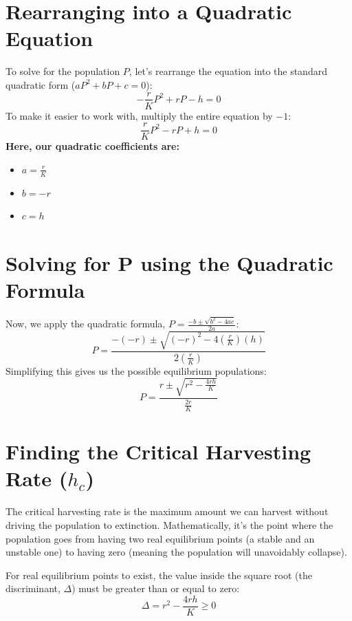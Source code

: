 \documentclass[12pt]{article}
\begin{document}
\section{Rearranging into a Quadratic Equation}
To solve for the population $P$, let's rearrange the equation into the standard quadratic form ($aP^2 + bP + c = 0$):
\begin{equation*}
-\frac{r}{K}P^2 + rP - h = 0
\end{equation*}
To make it easier to work with, multiply the entire equation by $-1$:
\begin{equation*}
\frac{r}{K}P^2 - rP + h = 0
\end{equation*}
\textbf{Here, our quadratic coefficients are:}
\begin{itemize}
    \item $a = \frac{r}{K}$
    \item $b = -r$
    \item $c = h$
\end{itemize}

\section{Solving for P using the Quadratic Formula}
Now, we apply the quadratic formula, $P = \frac{-b \pm \sqrt{b^2 - 4ac}}{2a}$:
\begin{equation*}
P = \frac{-(-r) \pm \sqrt{(-r)^2 - 4 \left(\frac{r}{K}\right) (h)}}{2 \left(\frac{r}{K}\right)}
\end{equation*}
Simplifying this gives us the possible equilibrium populations:
\begin{equation*}
P = \frac{r \pm \sqrt{r^2 - \frac{4rh}{K}}}{\frac{2r}{K}}
\end{equation*}

\section{Finding the Critical Harvesting Rate ($h_c$)}
The critical harvesting rate is the maximum amount we can harvest without driving the population to extinction. Mathematically, it's the point where the population goes from having two real equilibrium points (a stable and an unstable one) to having zero (meaning the population will unavoidably collapse). 

For real equilibrium points to exist, the value inside the square root (the discriminant, $\Delta$) must be greater than or equal to zero:
\begin{equation*}
\Delta = r^2 - \frac{4rh}{K} \ge 0
\end{equation*}
\end{document}
